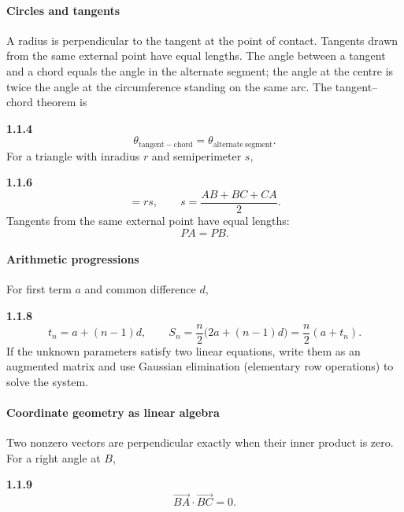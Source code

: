 \paragraph*{Circles and tangents}
A radius is perpendicular to the tangent at the point of contact. Tangents drawn from the same external point have equal lengths. The angle between a tangent and a chord equals the angle in the alternate segment; the angle at the centre is twice the angle at the circumference standing on the same arc.
\setcounter{enumii}{4}\setcounter{equation}{0}
The tangent--chord theorem is
\par\noindent\textbf{1.1.4}\quad
\begin{equation}
\theta_{\mathrm{tangent-chord}}=\theta_{\mathrm{alternate\ segment}}.\tag{1.1.4.1}\label{eq:tangent-chord}
\end{equation}
\setcounter{enumii}{6}\setcounter{equation}{0}
For a triangle with inradius $r$ and semiperimeter $s$,
\par\noindent\textbf{1.1.6}\quad
\begin{equation}
[ABC]=rs,\qquad s=\frac{AB+BC+CA}{2}.
\label{eq:triangle-inradius}
\end{equation}
Tangents from the same external point have equal lengths:
\begin{equation}
PA=PB.\tag{1.1.6.2}\label{eq:equal-tangents}
\end{equation}

\setcounter{enumii}{8}\setcounter{equation}{0}
\paragraph*{Arithmetic progressions}
For first term $a$ and common difference $d$,

\par\noindent\textbf{1.1.8}\quad
\begin{equation}
t_n=a+(n-1)d,\qquad
S_n=\frac n2\bigl(2a+(n-1)d\bigr)=\frac n2(a+t_n).
\label{eq:ap}
\end{equation}
If the unknown parameters satisfy two linear equations, write them as an augmented matrix and use Gaussian elimination (elementary row operations) to solve the system.

\paragraph*{Coordinate geometry as linear algebra}
Two nonzero vectors are perpendicular exactly when their inner product is zero.
For a right angle at $B$,
\par\noindent\textbf{1.1.9}\quad
\begin{equation}
\overrightarrow{BA}\cdot\overrightarrow{BC}=0.\tag{1.1.9.1}\label{eq:right-angle-dot}
\end{equation}

